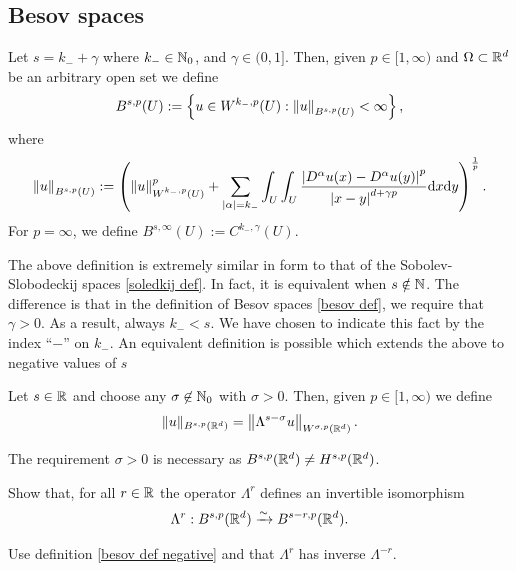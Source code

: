 \documentclass[
    a4paper,
    DIV=14,
    abstract=true,
    numbers=noenddot
]{scrartcl}
\begin{document}
\subsection{Besov spaces}
\begin{definition}\label{besov def}
    Let $s=k_{-}+\gamma$ where $k_{-} \in \mathbb{N}_0$, and $\gamma \in (0,1]$. Then, given  $p \in [1,\infty)$ and $\Omega  \subset \mathbb{R}^d$ be an arbitrary open set we define
    \begin{align*}
        B^{s ,p}(U):= \left\{u \in W^{k_{-} ,p}(U): \left\lVert u \right\rVert_{B^{s,p}(U)}<\infty\right\},
    \end{align*}
    where
    \begin{align*}
        \left\lVert u \right\rVert_{B^{s,p}(U)}:= \left(\left\lVert u \right\rVert_{W^{k_{-},p}(U)}^p+ \sum_{{\left| \alpha \right|}=k_- }\int_{U}\int_{U}\frac{{\left| D^\alpha u(x)-D^\alpha u(y) \right|}^p}{{\left| x-y \right|}^{d+\gamma p}}\mathrm{d} x \mathrm{d} y\right)^\frac{1}{p}.
    \end{align*}
    For $p = \infty$, we define $B^{s,\infty}(U):= C^{k_{-},\gamma}(U)$.
\end{definition}
The above definition is extremely similar in form to that of the Sobolev-Slobodeckij spaces \ref{soledkij def}. In fact, it is equivalent when $s \notin \mathbb{N}$. The difference is that in the definition of Besov spaces \ref{besov def}, we require that $\gamma >0$. As a result, always $k_{-}<s$. We have chosen to indicate this fact by the index ``$-$'' on $k_{-}$. An equivalent definition is possible which extends the above to negative values of $s$
\begin{definition}\label{besov def negative}
    Let $s \in \mathbb{R}$ and choose any $\sigma \not\in \mathbb{N}_0$ with $\sigma >0$. Then, given  $p \in [1,\infty)$ we define
    \begin{align*}
        \|u\|_{B^{s,p}(\mathbb{R}^d)}=\left\|\Lambda^{s-\sigma} u\right\|_{W^{\sigma,p}(\mathbb{R}^d)}.
    \end{align*}
\end{definition}
The requirement $\sigma >0$ is necessary as $B^{s,p}(\mathbb{R}^d)\neq H^{s,p}(\mathbb{R}^d)$.
\begin{exercise}
    Show that, for all $r \in \mathbb{R}$  the operator $\Lambda ^r$ defines an invertible isomorphism
    \begin{align*}
        \Lambda ^r : B^{s,p}(\mathbb{R}^d)\xrightarrow{\sim} B^{s-r ,p}(\mathbb{R}^d).
    \end{align*}
\end{exercise}
\begin{hint}
    Use definition \ref{besov def negative} and that $\Lambda^r$ has inverse $\Lambda^{-r}$.
\end{hint}
\end{document}
